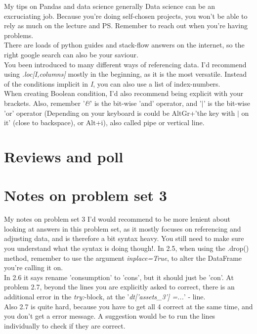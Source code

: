 \documentclass[10pt,danish,t,10pt]{beamer}
\newcommand{\code}[1]{\textit{#1}} %
\begin{document}
\begin{frame}{My tips on Pandas and data science generally}
    Data science can be an excruciating job. Because you're doing self-chosen projects, you won't be able to rely as much on the lecture and PS. Remember to reach out when you're having problems.\\
    There are loads of python guides and stack-flow answers on the internet, so the right google search can also be your saviour. \\
    You been introduced to many different ways of referencing data. I'd recommend using \code{.loc[I,columns]} mostly in the beginning, as it is the most versatile. Instead of the conditions implicit in \code{I}, you can also use a list of index-numbers. \\
    When creating Boolean condition, I'd also recommend being explicit with your brackets. Also, remember '\code{\&}' is the bit-wise 'and' operator, and '$\vert$' is the bit-wise 'or' operator (Depending on your keyboard is could be AltGr+'the key with $\vert$ on it' (close to backspace), or Alt+i), also called pipe or vertical line.
\end{frame}


\section{Reviews and poll}

\section{Notes on problem set 3}
\begin{frame}{My notes on problem set 3}
    I'd would recommend to be more lenient about looking at answers in this problem set, as it mostly focuses on referencing and adjusting data, and is therefore a bit syntax heavy. You still need to make sure you understand what the syntax is doing though!. \newline
    In 2.5, when using the .drop() method, remember to use the argument \code{inplace=True}, to alter the DataFrame you're calling it on. \\
    In 2.6 it says rename 'consumption' to 'cons', but it should just be 'con'. \newline
    At problem 2.7, beyond the lines you are explicitly asked to correct, there is an additional error in the \code{try:}-block, at the '\code{dt['assets\_3'] =...}' - line. \\ 
    Also 2.7 is quite hard, because you have to get all 4 correct at the same time, and you don't get a error message. A suggestion would be to run the lines individually to check if they are correct. 
\end{frame}
\end{document}
